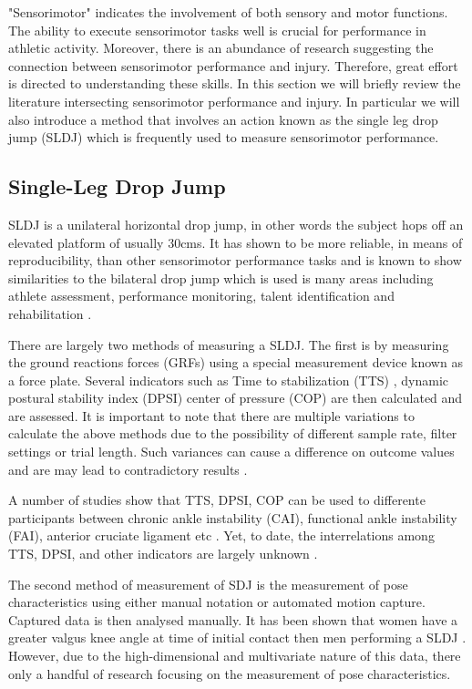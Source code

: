 
"Sensorimotor" indicates the involvement of both sensory and motor functions. The ability to execute sensorimotor tasks well is crucial for performance in athletic activity. Moreover, there is an abundance of research suggesting the connection between sensorimotor performance and injury. Therefore, great effort is directed to understanding these skills. In this section we will briefly review the literature intersecting sensorimotor performance and injury. In particular we will also introduce a method that involves an action known as the single leg drop jump (SLDJ) which is frequently used to measure sensorimotor performance. 

\subsection{Single-Leg Drop Jump}

SLDJ is a unilateral horizontal drop jump, in other words the subject hops off an elevated platform of usually 30cms. It has shown to be more reliable, in means of reproducibility, than other sensorimotor performance tasks and is known to show similarities to the bilateral drop jump which is used is many areas including athlete assessment, performance monitoring, talent identification and rehabilitation \cite{Stalbom2007ReliabilityReport}.

There are largely two methods of measuring a SLDJ. The first is by measuring the ground reactions forces (GRFs) using a special measurement device known as a force plate. Several indicators such as Time to stabilization (TTS) \cite{Fransz2014HowTask}, dynamic postural stability index (DPSI) \cite{Huurnink2019TheStudy} center of pressure (COP) \cite{Fransz2014HowTask} are then calculated and are assessed. It is important to note that there are multiple variations to calculate the above methods due to the possibility of different sample rate, filter settings or trial length. Such variances can cause a difference on outcome values and are may lead to contradictory results \cite{Fransz2015TimeValues}. 

A number of studies show that TTS, DPSI, COP can be used to differente participants between chronic ankle instability (CAI), functional ankle instability (FAI), anterior cruciate ligament etc \cite{WIKSTROM2005DetectionInstability}. Yet, to date, the interrelations among TTS, DPSI, and other indicators are largely unknown \cite{Huurnink2019TheStudy}.

The second method of measurement of SDJ is the measurement of pose characteristics using either manual notation or automated motion capture. Captured data is then analysed manually. 
It has been shown that women have a greater valgus knee angle at time of initial contact then men performing a SLDJ \cite{Russell2006SexJump}. However, due to the high-dimensional and multivariate nature of this data, there only a handful of research focusing on the measurement of pose characteristics. 

